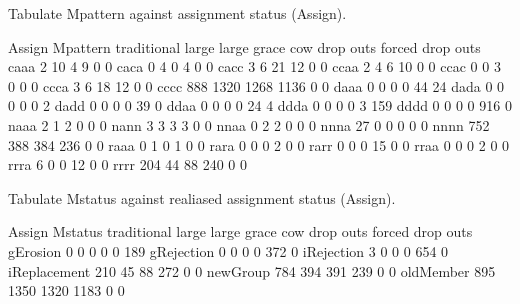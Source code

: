 Tabulate \textsf{Mpattern} against assignment status (\textsf{Assign}).
\begin{Schunk}
\begin{Soutput}
        Assign
Mpattern traditional large large grace  cow drop outs forced drop outs
    caaa           2    10           4    9         0                0
    caca           0     4           0    4         0                0
    cacc           3     6          21   12         0                0
    ccaa           2     4           6   10         0                0
    ccac           0     0           3    0         0                0
    ccca           3     6          18   12         0                0
    cccc         888  1320        1268 1136         0                0
    daaa           0     0           0    0        44               24
    dada           0     0           0    0         0                2
    dadd           0     0           0    0        39                0
    ddaa           0     0           0    0        24                4
    ddda           0     0           0    0         3              159
    dddd           0     0           0    0       916                0
    naaa           2     1           2    0         0                0
    nann           3     3           3    3         0                0
    nnaa           0     2           2    0         0                0
    nnna          27     0           0    0         0                0
    nnnn         752   388         384  236         0                0
    raaa           0     1           0    1         0                0
    rara           0     0           0    2         0                0
    rarr           0     0           0   15         0                0
    rraa           0     0           0    2         0                0
    rrra           6     0           0   12         0                0
    rrrr         204    44          88  240         0                0
\end{Soutput}
\end{Schunk}

Tabulate \textsf{Mstatus} against realiased assignment status (\textsf{Assign}).
\begin{Schunk}
\begin{Soutput}
              Assign
Mstatus        traditional large large grace  cow drop outs forced drop outs
  gErosion               0     0           0    0         0              189
  gRejection             0     0           0    0       372                0
  iRejection             3     0           0    0       654                0
  iReplacement         210    45          88  272         0                0
  newGroup             784   394         391  239         0                0
  oldMember            895  1350        1320 1183         0                0
\end{Soutput}
\end{Schunk}

